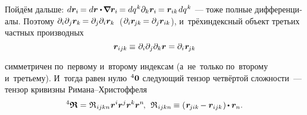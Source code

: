 \begin{otherlanguage}{russian}
Пойдём дальше: ${d\bm{r}_i \hspace{-0.2ex} = d\bm{r} \dotp \hspace{-0.2ex} \boldnabla \bm{r}_i \hspace{-0.2ex} = dq^{\hspace{.1ex}k} \partial_k \bm{r}_i \hspace{-0.2ex} = \bm{r}_{ik} \hspace{0.2ex} dq^{\hspace{.1ex}k}\hspace{-0.25ex}}$~--- тоже полные дифференциалы.
Поэтому ${\partial_i \partial_j \bm{r}_k \hspace{-0.2ex} = \partial_j \partial_i \bm{r}_k}$~(${\partial_i \bm{r}_{\hspace{-0.2ex}jk} \hspace{-0.2ex} = \partial_j \bm{r}_{ik}}$),
и~трёхиндексный объект третьих частных производных
\begin{equation}
\bm{r}_{ijk} \hspace{-0.1ex} \equiv \hspace{.1ex} \partial_i \partial_j \partial_k \bm{r}
= \partial_i \hspace{.12ex} \bm{r}_{\hspace{-0.2ex}jk} %
\end{equation}

\vspace{-0.2em} \noindent симметричен по~первому и~второму индексам (а~не~только по~второму и~третьему). И~тогда равен нулю~${\hspace{-0.16ex}^4\bm{0}}$ следующий тензор четвёртой сложности~--- тензор кривизны Римана\hbox{--}Христоффеля
\nopagebreak\vspace{.1em}\begin{equation}\label{riemanncurvaturetensor}
{^4\bm{\mathfrak{R}}} = \hspace{.12ex} \mathfrak{R}_{\hspace{.1ex}ijkn} \hspace{.12ex} \bm{r}^i \bm{r}^j \bm{r}^k \bm{r}^n \hspace{-0.25ex}, \:\:
\mathfrak{R}_{\hspace{.1ex}ijkn} \hspace{-0.12ex} \equiv \left( \hspace{.12ex} \bm{r}_{\hspace{-0.2ex}jik} \hspace{-0.2ex} - \bm{r}_{ijk} \hspace{.12ex} \right) \hspace{-0.16ex} \dotp \bm{r}_n .
\end{equation}




\end{otherlanguage}
